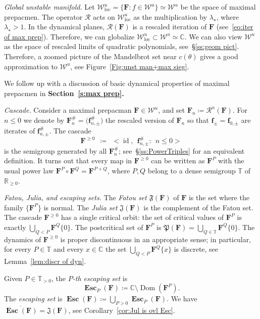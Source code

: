 \documentclass{amsart}
\newcommand{\Dom}{\operatorname {Dom}}
\renewcommand{\sp}{{\ \ }}
\newcommand{\1}{{\mathbb 1 }}
\newcommand\PT{\mathbb{ T}}
\newcommand\RR{\mathcal{R}}
\newcommand\Jul{{\mathfrak J}}
\newcommand\Post{{\mathfrak P}}
\newcommand{\bF}{{\mathbf F}}
\newcommand{\bbf}{{\mathbf f}}
\newcommand{\str}{{\star}}
\def\loc{{\mathrm{loc}}}
\newcommand\WW{\mathcal{W}}
\newcommand\Unst{{\boldsymbol{\mathcal{W}}^u}}
\newcommand\UnstLoc{{\boldsymbol{\mathcal{W}}^u_\loc}}
\newcommand{\C}{\mathbb{C}}
\newcommand{\R}{\mathbb{R}}
\theoremstyle{remark}
\numberwithin{equation}{section}
\theoremstyle{definition}
\newcommand{\Fat}{{\mathfrak F}}
\newcommand{\Esc}{{\boldsymbol{\operatorname{Esc}}}}
\newcommand{\id}{\operatorname{id}}
\theoremstyle{nonumberbreak}
\begin{document}
\emph{Global unstable manifold.} Let $\UnstLoc =\{\bF\colon f\in \WW^u\}\simeq \WW^u$ be the space of maximal prepacmen. The operator $\RR$ acts on $\UnstLoc$ as the multiplication by $\lambda_\str$, where $\lambda_\str>1$. In the dynamical planes, $\RR(\bF)$ is a rescaled iteration of $\bF$ (see~\eqref{eq:iter of max prep}). Therefore, we can globalize $\UnstLoc\subset\Unst\simeq \C$. We can also view $\Unst$ as the space of rescaled limits of quadratic polynomials, see~\S\ref{ss:geom pict}. Therefore, a zoomed picture of the Mandelbrot set near ${c(\theta)}$ gives a good approximation to $\Unst$, see Figure~\ref{Fig:unst man+max sieg}.


We follow up with a discussion of  basic dynamical properties of maximal prepacmen in {\bf Section~\ref{s:max prep}.}


\emph{Cascade.} Consider a maximal prepacman $\bF\in \Unst$, and set $\bF_n\coloneqq \RR^n(\bF)$. For $n\le 0$ we denote by $\bF^\#_n=\big(\bbf^\#_{n,\pm}\big)$ the rescaled version of $\bF_n$ so that $\bbf_\pm=\bbf_{0,\pm}$ are iterates of $\bbf^\#_{n,\pm}$. The cascade \[\bF^{\ge 0}\sp\coloneqq \sp \big<
\id, \sp \bbf_{n,\pm}^\#:\sp n\le 0\big>\] is the semigroup generated by all $\bF^{\#}_n$; see~\S\ref{ss:PowerTriples} for an equivalent definition. It turns out that every map in $\bF^{\ge 0}$ can be written as $\bF^P$ with the usual power law $\bF^{P}\circ \bF^Q=\bF^{P+Q}$, where $P,Q$ belong to a dense semigroup $\PT$ of $\R_{\ge0}$. 






\emph{Fatou, Julia, and escaping sets.} 
The \emph{Fatou set} $\Fat(\bF)$ of $\bF$ is the set where the family $\{\bF^P\}$ is normal. The \emph{Julia set} $\Jul( \bF)$ is the complement of the Fatou set. The cascade $\bF^{\ge0}$ has a single critical orbit: the set of critical values of $\bF^P$ is exactly $\displaystyle{\bigcup_{Q<P} \bF^Q\{0\}}$. The postcritical set of $\bF^P$ is $\Post(\bF)=\displaystyle{\bigcup_{Q\in \PT} \bF^Q\{0\}}$. The dynamics of $\bF^{\ge0 }$ is proper discontinuous in an appropriate sense; in particular, for every $P\in \PT$ and every $x\in \C$ the set $\displaystyle{\bigcup_{Q<P}\bF^{Q}\{x\}}$ is discrete, see Lemma~\ref{lem:discr of dyn}.


 Given $P\in \PT_{>0}$, the \emph{$P$-th escaping set}
 is
\[\Esc_P(\bF)\coloneqq \C\setminus \Dom(\bF^P).\] 
The \emph{escaping set} is
$\Esc(\bF)\coloneqq \bigcup_{P>0} \Esc_P(\bF).$ 
We have $\overline { \Esc(\bF)}=\Jul(\bF)$, see Corollary~\ref{cor:Jul is ovl Esc}. 
\end{document}
